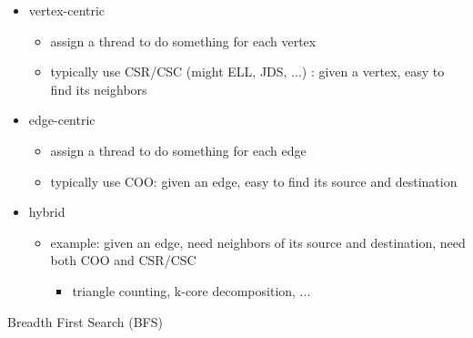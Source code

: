\documentclass{article}
\begin{document}
\begin{itemize}
\item vertex-centric
\begin{itemize}
\item assign a thread to do something for each vertex
\item typically use CSR/CSC (might ELL, JDS, ...) : given a vertex, easy to find its neighbors
\end{itemize}
\item edge-centric
\begin{itemize}
\item assign a thread to do something for each edge
\item typically use COO: given an edge, easy to find its source and destination
\end{itemize}
\item hybrid
\begin{itemize}
\item example: given an edge, need neighbors of its source and destination, need both COO and CSR/CSC
\begin{itemize}
\item triangle counting, k-core decomposition, ...

\end{itemize}
\end{itemize}
\end{itemize}
Breadth First Search (BFS) 
\end{document}
